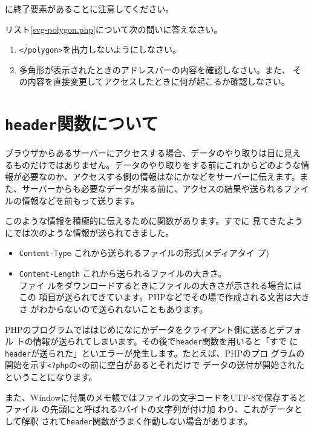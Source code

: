 に終了要素があることに注意してください。
\begin{Problem}\upshape
リスト\ref{svg-polygon.php}について次の問いに答えなさい。
\begin{enumerate}
 \item \texttt{</polygon>}を出力しないようにしなさい。
 \item 多角形が表示されたときのアドレスバーの内容を確認しなさい。また、
       その内容を直接変更してアクセスしたときに何が起こるか確認しなさい。
\end{enumerate}
\end{Problem}

\section{\texttt{header}関数について}
ブラウザからあるサーバーにアクセスする場合、データのやり取りは目に見え
るものだけではありません。データのやり取りをする前にこれからどのような情
報が必要なのか、アクセスする側の情報はなにかなどをサーバーに伝えます。ま
た、サーバーからも必要なデータが来る前に、アクセスの結果や送られるファイ
ルの情報などを前もって送ります。

このような情報を積極的に伝えるために関数があります。すでに
見てきたようにでは次のような情報が送られてきました。
\begin{itemize}
 \item \texttt{Content-Type} これから送られるファイルの形式(メディアタイ
       プ)
 \item \texttt{Content-Length} これから送られるファイルの大きさ。\\ファイ
       ルをダウンロードするときにファイルの大きさが示される場合にはこの
       項目が送られてきています。PHPなどでその場で作成される文書は大きさ
       がわからないので送られないこともあります。
\end{itemize}
PHPのプログラムでははじめになにかデータをクライアント側に送るとデフォル
トの情報が送られてしまいます。その後で\texttt{header}関数を用いると「すで
に\texttt{header}が送られた」といエラーが発生します。たとえば、PHPのプロ
グラムの開始を示す\texttt{<?php}の\texttt{<}の前に空白があるとそれだけで
データの送付が開始されたということになります。

また、Windowに付属のメモ帳ではファイルの文字コードをUTF-8で保存するとファイル
の先頭にと呼ばれる2バイトの文字列が付け加
わり、これがデータとして解釈
されて\texttt{header}関数がうまく作動しない場合があります。

